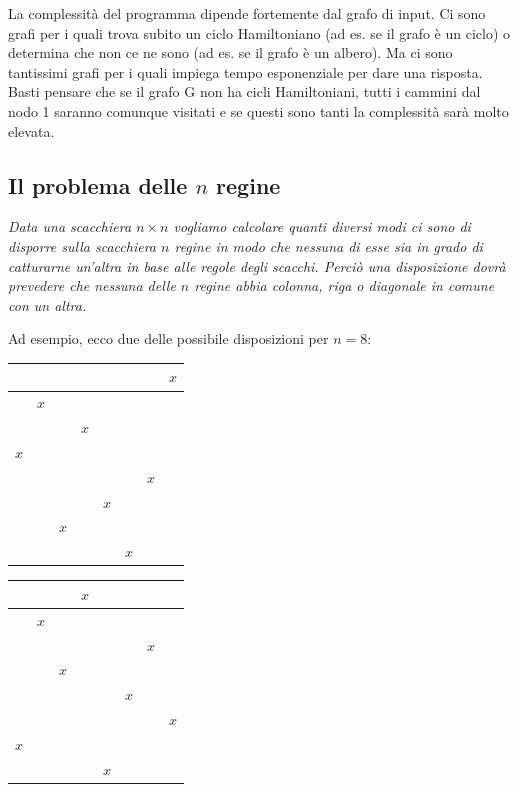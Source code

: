 La complessità del programma dipende fortemente dal grafo di input. Ci sono grafi per i quali trova subito un ciclo Hamiltoniano (ad es. se il grafo è un ciclo) o determina che non ce ne sono (ad es. se il grafo è un albero). Ma ci sono tantissimi grafi per i quali impiega tempo esponenziale per dare una risposta. Basti pensare che se il grafo G non ha cicli Hamiltoniani, tutti i cammini dal nodo 1 saranno comunque visitati e se questi sono tanti la complessità sarà molto elevata.

\subsection{Il problema delle $n$ regine}
\textit{Data una scacchiera $n\times n$ vogliamo calcolare quanti diversi modi ci sono di disporre sulla scacchiera $n$ regine in modo che nessuna di esse sia in grado di catturarne un'altra in base alle regole degli scacchi. Perciò una disposizione dovrà prevedere che nessuna delle $n$ regine abbia colonna, riga o diagonale in comune con un altra.}

Ad esempio, ecco due delle possibile disposizioni per $n = 8$:
\begin{center}
\begin{tabular}{|c|c|c|c|c|c|c|c|}
    \hline
     &&&&&&&$x$\\\hline
     &$x$&&&&&&\\\hline
     &&&$x$&&&&\\\hline
     $x$&&&&&&&\\\hline
     &&&&&&$x$&\\\hline
     &&&&$x$&&&\\\hline
     &&$x$&&&&&\\\hline
     &&&&&$x$&&\\\hline
\end{tabular}\hspace{0.5cm}
\begin{tabular}{|c|c|c|c|c|c|c|c|}
    \hline
     &&&$x$&&&&\\\hline
     &$x$&&&&&&\\\hline
     &&&&&&$x$&\\\hline
     &&$x$&&&&&\\\hline
     &&&&&$x$&&\\\hline
     &&&&&&&$x$\\\hline
     $x$&&&&&&&\\\hline
     &&&&$x$&&&\\\hline
\end{tabular}
\end{center}

